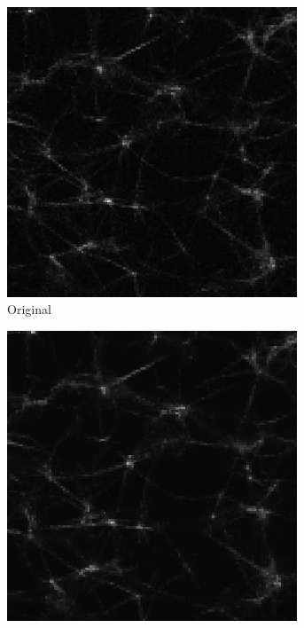 \begin{figure}[!htb]
  \centering
  \begin{subfigure}{0.33\textwidth}
    \centering
    \includegraphics[width=0.95\textwidth]{Figures/chapter-image/denoise_actin1_original.png}%
    \caption{Original}
    \label{subfig:denoise_original}
  \end{subfigure}%
  \begin{subfigure}{0.33\textwidth}
    \centering
    \includegraphics[width=0.95\textwidth]{Figures/chapter-image/denoise_actin1_tv1.png}%

\end{subfigure}
\end{figure}
